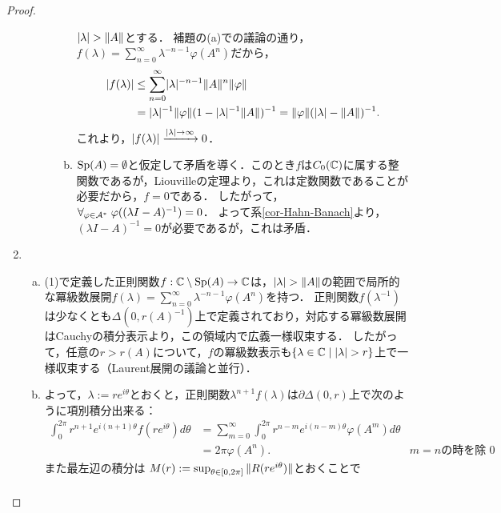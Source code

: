 \documentclass[uplatex,dvipdfmx]{jsreport}
\begin{document}
\begin{proof}
\begin{enumerate}
\begin{description}
\begin{enumerate}[(a)]
                $\lvert\lambda\rvert>\|A\|$とする．
                補題の(a)での議論の通り，$f(\lambda)=\sum_{n=0}^\infty\lambda^{-n-1}\varphi(A^n)$だから，
                \begin{align*}
                    \lvert f(\lambda)\rvert&\le\sum^\infty_{n=0}\lvert\lambda\rvert^{-n-1}\|A\|^n\|\varphi\|\\
                    &=\lvert\lambda\rvert^{-1}\|\varphi\|(1-\lvert\lambda\rvert^{-1}\|A\|)^{-1}=\|\varphi\|(\lvert\lambda\rvert-\|A\|)^{-1}.
                \end{align*}
                これより，$\lvert f(\lambda)\rvert\xrightarrow{\lvert\lambda\rvert\to\infty}0$．
                \item $\mathrm{Sp}(A)=\emptyset$と仮定して矛盾を導く．このとき$f$は$C_0(\mathbb{C})$に属する整関数であるが，Liouvilleの定理より，これは定数関数であることが必要だから，$f=0$である．
                したがって，$\forall_{\varphi\in\mathcal{A}^*}\;\varphi((\lambda I-A)^{-1})=0$．
                よって系\ref{cor-Hahn-Banach}より，$(\lambda I-A)^{-1}=0$が必要であるが，これは矛盾．
            \end{enumerate}
        \end{description}
        \item \begin{enumerate}[(a)]
            \item (1)で定義した正則関数$f:\mathbb{C}\setminus\mathrm{Sp}(A)\to\mathbb{C}$は，$\lvert\lambda\rvert>\|A\|$の範囲で局所的な冪級数展開$f(\lambda)=\sum^\infty_{n=0}\lambda^{-n-1}\varphi(A^n)$を持つ．
            正則関数$f(\lambda^{-1})$は少なくとも$\Delta(0,r(A)^{-1})$上で定義されており，対応する冪級数展開はCauchyの積分表示より，この領域内で広義一様収束する．
            したがって，任意の$r>r(A)$について，$f$の冪級数表示も$\left\{\lambda\in\mathbb{C}\mid\lvert\lambda\rvert>r\right\}$上で一様収束する（Laurent展開の議論と並行）．
            \item よって，$\lambda:=re^{i\theta}$とおくと，正則関数$\lambda^{n+1}f(\lambda)$は$\partial\Delta(0,r)$上で次のように項別積分出来る：
            \begin{align*}
                \int^{2\pi}_0r^{n+1}e^{i(n+1)\theta}f(re^{i\theta})d\theta&=\sum^\infty_{m=0}\int^{2\pi}_0r^{n-m}e^{i(n-m)\theta}\varphi(A^m)d\theta\\
                &=2\pi\varphi(A^n).&m=n\text{の時を除いて積分は}0
            \end{align*}
            また最左辺の積分は
            $M(r):=\sup_{\theta\in[0,2\pi]}\|R(re^{i\theta})\|$とおくことで
            \begin{align*}

\end{align*}
\end{enumerate}
\end{enumerate}
\end{proof}
\end{document}
